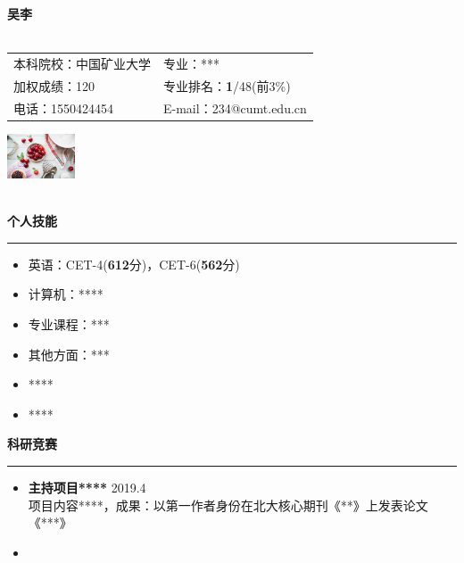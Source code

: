\documentclass[12pt]{ctexart}
\newcommand{\myThemeColor}{tjl}
\newcommand{\boldnum}[1]{\textbf{\large\color{\myThemeColor}#1}}
\newcommand{\cvsection}[1]
{\Large\color{\myThemeColor}\textbf{#1}\par
	\vspace{0.2cm}\normalsize\normalfont\normalcolor}
\begin{document}
\begin{spacing}{0.9}

\begin{minipage}[b]{5cm}
	\Huge\bfseries{\color{\myThemeColor}吴李}\normalsize\normalfont\\
	\\	\hspace{2em}
	\begin{tabular}{ll}
		本科院校：中国矿业大学    & 专业：***                    \\
		加权成绩：120         & 专业排名：\boldnum{1}/48(前3\%)                      \\
		电话：1550424454 & E-mail：234@cumt.edu.cn%
	\end{tabular}
	\par\vspace{0pt}
\end{minipage}
	\hfill 
	\begin{minipage}[b]{3cm}
		\includegraphics[width=2.0cm]{fig/figure.jpg}
		    \par\vspace{0pt}
	\end{minipage}
 \\
	\cvsection{\color{\myThemeColor}个人技能}
		\hrule
		\begin{itemize}
			\item[\ding{72}] 英语：CET-4(\boldnum{612}分)，CET-6(\boldnum{562}分)
			\item[\ding{72}] 计算机：**** 
			\item[\ding{72}] 专业课程：***
			\item[\ding{72}] 其他方面：***
			\item[\ding{72}] ****
			\item[\ding{72}] ****
		\end{itemize}
	\cvsection{\color{\myThemeColor}科研竞赛}
		\hrule
	\begin{itemize}
		\item[\ding{72}] \textbf{主持项目****}\hfill
		\color{\myThemeColor}2019.4\\
		\normalsize\normalfont\normalcolor
		项目内容****，成果：以第一作者身份在北大核心期刊《**》上发表论文《***》
		\item[\ding{72}] 

\end{itemize}
\end{spacing}
\end{document}
